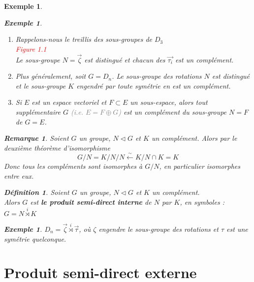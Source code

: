 \documentclass[a4paper, oneside]{report}
\theoremstyle{break}
\newtheorem{definition}[thm]{Définition}
\newtheorem{exemple}[thm]{Exemple}
\newtheorem{remarque}[thm]{Remarque}
\newcommand{\gray}[1]{\textcolor{gray}{#1}}
\newcommand{\red}[1]{\textcolor{red}{#1}}
\newcommand{\slign}{\textbf}
\newcommand{\os}{\overset}
\begin{document}
\begin{exemple}
\begin{exemple}
\begin{enumerate}
\item Rappelons-nous le treillis des sous-groupes de $D_3$\\

\red{Figure 1.1}\\

Le sous-groupe $N = \vec{\zeta}$ est distingué et chacun des $\vec{\tau_i}$ est un complément.

\medbreak

\item Plus généralement, soit $G = D_n$. Le sous-groupe des rotations $N$ est distingué et le sous-groupe $K$ engendré par toute symétrie en est un complément.

\medbreak

\item  Si $E$ est un espace vectoriel et $F \subset E$ un sous-espace, alors tout supplémentaire $G$ \gray{(i.e. $E = F \oplus G$)} est un complément du sous-groupe $N = F$ de $G = E$.

\end{enumerate}
\end{exemple}

\begin{remarque}
Soient $G$ un groupe, $N \triangleleft G$ et $K$ un complément. Alors par le deuxième théorème d'isomorphisme
\[
G / N = K / N \big/ N \os{\sim}{\leftarrow} K \big/ N \cap K = K
\]
Donc tous les compléments sont isomorphes à $G / N$, en particulier isomorphes entre eux.
\end{remarque}

\begin{definition}
Soient $G$ un groupe, $N \triangleleft G$ et $K$ un complément.\\
Alors $G$ est \slign{le produit semi-direct interne} de $N$ par $K$, en symboles : $G = N \os{i}{\rtimes} K$
\end{definition}

\begin{exemple}
$D_n = \vec{\zeta} \os{i}{\rtimes} \vec{\tau}$, où $\zeta$ engendre le sous-groupe des rotations et $\tau$ est une symétrie quelconque.
\end{exemple}

\section{Produit semi-direct externe}


\end{exemple}
\end{document}
